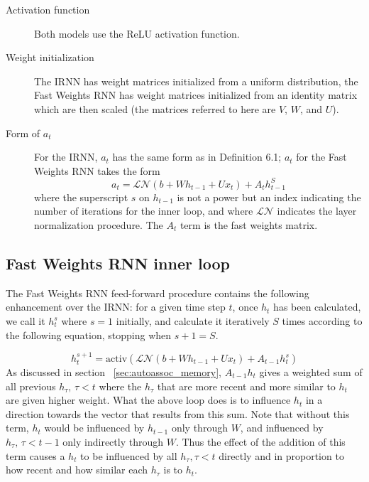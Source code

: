 \begin{description}
  \item[Activation function] Both models use the ReLU activation function.
  \item[Weight initialization] The IRNN has weight matrices initialized from a uniform distribution, the Fast Weights RNN has weight matrices initialized from an identity matrix which are then scaled (the matrices referred to here are $V$, $W$, and $U$).
  \item[Form of $a_t$] For the IRNN, $a_t$ has the same form as in Definition 6.1; $a_t$ for the Fast Weights RNN takes the form
    \begin{equation*}
      a_t = \mathcal{LN}(b + Wh_{t-1} + Ux_t) + A_t h_{t-1}^S
    \end{equation*}
    where the superscript $s$ on $h_{t-1}$ is not a power but an index indicating the number of iterations for the inner loop, and where $\mathcal{LN}$ indicates the layer normalization procedure. The $A_t$ term is the fast weights matrix.
\end{description}

\subsection{Fast Weights RNN inner loop}

The Fast Weights RNN feed-forward procedure contains the following enhancement over the IRNN: for a given time step $t$, once $h_t$ has been calculated, we call it $h_t^s$ where $s = 1$ initially, and calculate it iteratively $S$ times according to the following equation, stopping when $s+1 = S$.

\begin{equation*}
h_{t}^{s+1} = \mbox{activ}( \mathcal{LN}(b + Wh_{t-1} + Ux_{t}) + A_{t-1} h_{t}^s)
\end{equation*}
%
As discussed in section ~\ref{sec:autoassoc_memory}, $A_{t-1} h_t$ gives a weighted sum of all previous $h_\tau,\, \tau < t$ where the $h_\tau$ that are more recent and more similar to $h_t$ are given higher weight. What the above loop does is to influence $h_t$ in a direction towards the vector that results from this sum. Note that without this term, $h_t$ would be influenced by $h_{t-1}$ only through $W$, and influenced by $h_\tau,\, \tau < t-1$ only indirectly through $W$. Thus the effect of the addition of this term causes a $h_t$ to be influenced by all $h_\tau, \tau < t$ directly and in proportion to how recent and how similar each $h_\tau$ is to $h_t$.


